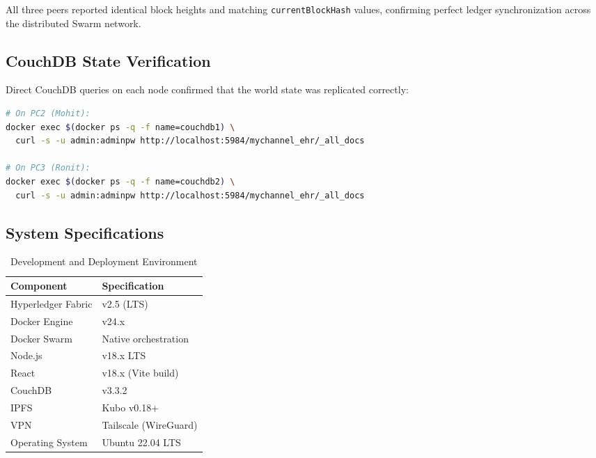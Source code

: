 All three peers reported identical block heights and matching \texttt{currentBlockHash} values, confirming perfect ledger synchronization across the distributed Swarm network.

\subsection{CouchDB State Verification}

Direct CouchDB queries on each node confirmed that the world state was replicated correctly:

\begin{lstlisting}[language=bash, caption={CouchDB State Query on Worker Nodes}]
# On PC2 (Mohit):
docker exec $(docker ps -q -f name=couchdb1) \
  curl -s -u admin:adminpw http://localhost:5984/mychannel_ehr/_all_docs

# On PC3 (Ronit):
docker exec $(docker ps -q -f name=couchdb2) \
  curl -s -u admin:adminpw http://localhost:5984/mychannel_ehr/_all_docs
\end{lstlisting}


\subsection{System Specifications}

\begin{table}[h]
\centering
\caption{Development and Deployment Environment}
\label{tab:system_specs}
\begin{tabular}{|l|l|}
\hline
\textbf{Component} & \textbf{Specification} \\
\hline
Hyperledger Fabric & v2.5 (LTS) \\
\hline
Docker Engine & v24.x \\
\hline
Docker Swarm & Native orchestration \\
\hline
Node.js & v18.x LTS \\
\hline
React & v18.x (Vite build) \\
\hline
CouchDB & v3.3.2 \\
\hline
IPFS & Kubo v0.18+ \\
\hline
VPN & Tailscale (WireGuard) \\
\hline
Operating System & Ubuntu 22.04 LTS \\
\hline
\end{tabular}
\end{table}
